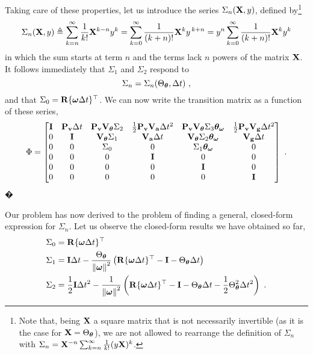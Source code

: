 Taking care of these properties, let us introduce the series $\Sigma_n({\bf X},y)$, defined by\footnote{Note that, being ${\bf X}$ a square matrix that is not necessarily invertible (as it is the case for ${\bf X}=\Theta_{\bm \theta}$), we are not allowed to rearrange the definition of $\Sigma_n$ with $\Sigma_n={\bf X}^{-n}\sum_{k=n}^\infty\frac{1}{k!}(y{\bf X})^{k}$.}
%
\begin{equation}
\Sigma_n({\bf X},y) \triangleq \sum_{k=n}^\infty \frac{1}{k!}{\bf X}^{k-n}y^k = \sum_{k=0}^\infty \frac{1}{(k+n)!}{\bf X}^{k}y^{\,k+n}= y^n\sum_{k=0}^\infty \frac{1}{(k+n)!}{\bf X}^k y^k
\end{equation}
%
in which the sum starts at term $n$ and the terms lack $n$ powers of the matrix ${\bf X}$. 
It follows immediately that $\Sigma_1$ and $\Sigma_2$ respond to 
%
\begin{equation}
\Sigma_n=\Sigma_n(\Theta_{\bm \theta},\Delta t)~,
\end{equation}
%
and that $\Sigma_0 = {\bf R}\{{\bm \omega}\Delta t\}^{\top}$. 
We can now write the transition matrix  as a function of these series,
%
\begin{equation}
\Phi = \begin{bmatrix}
{\bf I} & {\bf P}_{\bf v}\Delta t & {\bf P}_{\bf v}{\bf V}_{\bm \theta}\Sigma_2 &  \tfrac12{\bf P}_{\bf v}{\bf V}_{\bf a}\Delta t^2 & {\bf P}_{\bf v}{\bf V}_{\bm \theta}\Sigma_3{\bm \theta}_{\bm \omega} & \tfrac12{\bf P}_{\bf v}{\bf V}_{\bf g}\Delta t^2 \\
0 & {\bf I} & {\bf V}_{\bm \theta}\Sigma_1 &  {\bf V}_{\bf a}\Delta t & {\bf V}_{\bm \theta}\Sigma_2{\bm \theta}_{\bm \omega} & {\bf V}_{\bf g}\Delta t \\
0 & 0 & \Sigma_0 &  0 & \Sigma_1{\bm \theta}_{\bm \omega} & 0 \\
0 & 0 & 0 & {\bf I} & 0 & 0 \\
0 & 0 & 0 & 0 & {\bf I} & 0 \\
0 & 0 & 0 & 0 & 0 & {\bf I} \\
\end{bmatrix}~.\label{equ:fullIMUtranmat}
\end{equation}�

Our problem has now derived to the problem of finding a general, closed-form expression for $\Sigma_n$. 
Let us observe the closed-form results we have obtained so far,
%
%
\begin{align}
\Sigma_0 &= {\bf R}\{{\bm \omega}\Delta t\}^{\top} \\
\Sigma_1 &=
  {\bf I}\Delta t 
- \frac{\Theta_{\bm \theta}}{{\left\|{\bm \omega}\right\|}^2}\left({\bf R}\{{\bm \omega}\Delta t\}^{\top} - {\bf I} - \Theta_{\bm \theta}\Delta t \right) \\
\Sigma_2 &= 
  \frac12 {\bf I}\Delta t^2
- \frac{1}{{\left\|{\bm \omega}\right\|}^2}\left(
  {\bf R}\{{\bm \omega}\Delta t\}^{\top} - {\bf I} - \Theta_{\bm \theta}\Delta t - \frac12\Theta_{\bm \theta}^2\Delta t^2
 \right)~.
\end{align}%

